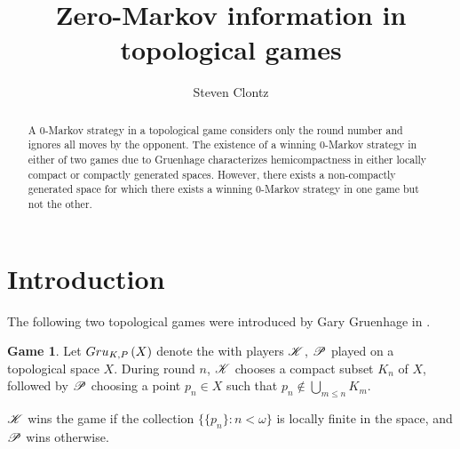\documentclass{amsart}
\theoremstyle{definition}
\newtheorem{game}[theorem]{Game}
\begin{document}
\title{Zero-Markov information in topological games}




\author{Steven Clontz}
\address{Department of Mathematics and Statistics, Univeristy of North Carolina
at Charlotte, Charlotte, NC 28223}




\begin{abstract}
A \(0\)-Markov strategy in a topological game considers only the round number
and ignores all moves by the opponent. The existence of a winning \(0\)-Markov
strategy in either of two games due to Gruenhage characterizes hemicompactness
in either locally compact or compactly generated spaces. However, there
exists a non-compactly generated space for which there exists a winning
\(0\)-Markov strategy in one game but not the other.
\end{abstract}


\maketitle

\section{Introduction}

The following two topological games were introduced by Gary Gruenhage
in \cite{MR858337}.

\begin{game}
  Let $Gru_{K,P}\left({X}\right)$ denote the 
  with players $\mathscr{K}$, $\mathscr{P}$ played on a topological space \(X\).
  During round $n$, $\mathscr{K}$ chooses
  a compact subset $K_n$ of $X$, followed by $\mathscr{P}$ choosing a point
  $p_n\in X$ such that $p_n\not\in \bigcup_{m\leq n}K_m$.

  $\mathscr{K}$ wins the game if the collection $\{\{p_n\}:n<\omega\}$ is locally
  finite in the space, and $\mathscr{P}$ wins otherwise.
\end{game}
\end{document}
